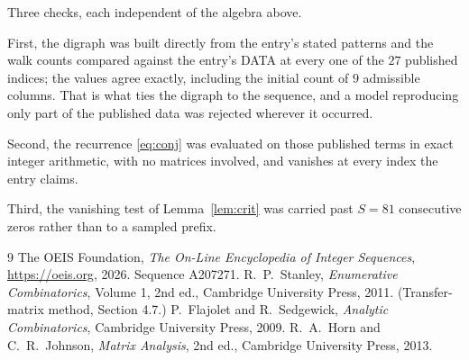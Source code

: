 \documentclass[11pt,a4paper]{article}
\theoremstyle{plain}
\theoremstyle{definition}
\begin{document}
Three checks, each independent of the algebra above.

First, the digraph was built directly from the entry's stated patterns and the walk counts
compared against the entry's DATA at every one of the $27$ published indices; the
values agree exactly, including the initial count of $9$ admissible columns. That is
what ties the digraph to the sequence, and a model reproducing only part of the published
data was rejected wherever it occurred.

Second, the recurrence \eqref{eq:conj} was evaluated on those published terms in exact
integer arithmetic, with no matrices involved, and vanishes at every index the entry claims.

Third, the vanishing test of Lemma~\ref{lem:crit} was carried past $S=81$ consecutive
zeros rather than to a sampled prefix.

\begin{thebibliography}{9}
 The OEIS Foundation, \emph{The On-Line Encyclopedia of Integer
Sequences}, \url{https://oeis.org}, 2026. Sequence A207271.
 R.~P.~Stanley, \emph{Enumerative Combinatorics}, Volume 1, 2nd ed.,
Cambridge University Press, 2011. (Transfer-matrix method, Section 4.7.)
 P.~Flajolet and R.~Sedgewick, \emph{Analytic Combinatorics}, Cambridge
University Press, 2009.
 R.~A.~Horn and C.~R.~Johnson, \emph{Matrix Analysis}, 2nd ed., Cambridge
University Press, 2013.
\end{thebibliography}
\end{document}
